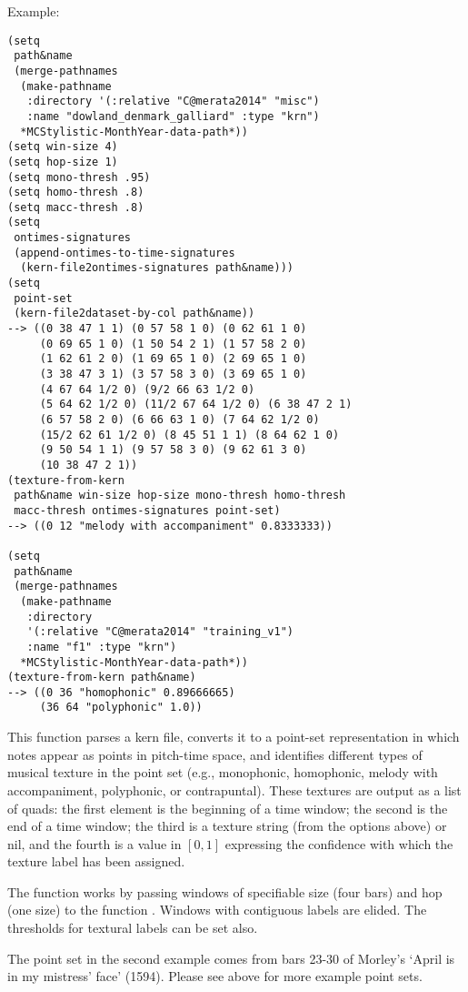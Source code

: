 \vspace{0.5cm}
\noindent Example:
\begin{verbatim}
(setq
 path&name
 (merge-pathnames
  (make-pathname
   :directory '(:relative "C@merata2014" "misc")
   :name "dowland_denmark_galliard" :type "krn")
  *MCStylistic-MonthYear-data-path*))
(setq win-size 4)
(setq hop-size 1)
(setq mono-thresh .95)
(setq homo-thresh .8)
(setq macc-thresh .8)
(setq
 ontimes-signatures
 (append-ontimes-to-time-signatures
  (kern-file2ontimes-signatures path&name)))
(setq
 point-set
 (kern-file2dataset-by-col path&name))
--> ((0 38 47 1 1) (0 57 58 1 0) (0 62 61 1 0)
     (0 69 65 1 0) (1 50 54 2 1) (1 57 58 2 0)
     (1 62 61 2 0) (1 69 65 1 0) (2 69 65 1 0)
     (3 38 47 3 1) (3 57 58 3 0) (3 69 65 1 0)
     (4 67 64 1/2 0) (9/2 66 63 1/2 0)
     (5 64 62 1/2 0) (11/2 67 64 1/2 0) (6 38 47 2 1)
     (6 57 58 2 0) (6 66 63 1 0) (7 64 62 1/2 0)
     (15/2 62 61 1/2 0) (8 45 51 1 1) (8 64 62 1 0)
     (9 50 54 1 1) (9 57 58 3 0) (9 62 61 3 0)
     (10 38 47 2 1))
(texture-from-kern
 path&name win-size hop-size mono-thresh homo-thresh
 macc-thresh ontimes-signatures point-set)
--> ((0 12 "melody with accompaniment" 0.8333333))

(setq
 path&name
 (merge-pathnames
  (make-pathname
   :directory
   '(:relative "C@merata2014" "training_v1")
   :name "f1" :type "krn")
  *MCStylistic-MonthYear-data-path*))
(texture-from-kern path&name)
--> ((0 36 "homophonic" 0.89666665)
     (36 64 "polyphonic" 1.0))
\end{verbatim}

\noindent This function parses a kern file, converts
it to a point-set representation in which notes appear
as points in pitch-time space, and identifies
different types of musical texture in the point set
(e.g., monophonic, homophonic, melody with
accompaniment, polyphonic, or contrapuntal). These
textures are output as a list of quads: the first
element is the beginning of a time window; the second
is the end of a time window; the third is a texture
string (from the options above) or nil, and the fourth
is a value in $[0, 1]$ expressing the confidence with
which the texture label has been assigned.

The function works by passing windows of specifiable
size (four bars) and hop (one size) to the function
. Windows with
contiguous labels are elided. The thresholds for
textural labels can be set also.

The point set in the second example comes from bars
23-30 of Morley's `April is in my mistress' face'
(1594). Please see above for more example point
sets.


